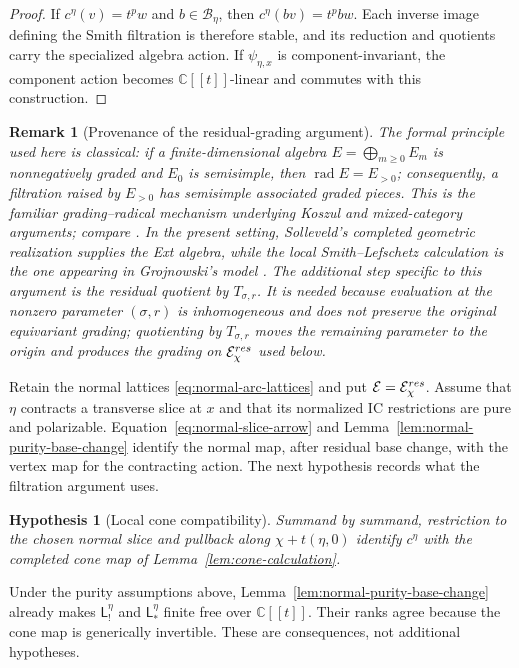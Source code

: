 \documentclass[10pt,a4paper]{amsart}
\newtheorem{hypothesis}[theorem]{Hypothesis}
\newtheorem*{unnumberedremark}{Remark}
\newcommand{\C}{\mathbb C}
\newcommand{\A}{\C[[t]]}
\begin{document}
\begin{proof}
If $c^\eta(v)=t^p w$ and $b\in\mathcal B_\eta$, then
$c^\eta(bv)=t^pbw$.  Each inverse image defining the Smith filtration is
therefore stable, and its reduction and quotients carry the specialized
algebra action.  If $\psi_{\eta,x}$ is component-invariant, the component
action becomes $\A$-linear and commutes with this construction.
\end{proof}

\begin{unnumberedremark}[Provenance of the residual-grading argument]
The formal principle used here is classical: if a finite-dimensional algebra
$E=\bigoplus_{m\geq0}E_m$ is nonnegatively graded and $E_0$ is semisimple,
then $\operatorname{rad}E=E_{>0}$; consequently, a filtration raised by
$E_{>0}$ has semisimple associated graded pieces.  This is the familiar
grading--radical mechanism underlying Koszul and mixed-category arguments;
compare \cite[Section~2.1]{BGS}.  In the present setting, Solleveld's
completed geometric realization supplies the Ext algebra, while the local
Smith--Lefschetz calculation is the one appearing in Grojnowski's model
\cite[Section~2.3]{GrojnowskiJantzen}.  The additional step specific to this
argument is the residual quotient by $T_{\sigma,r}$.  It is needed because
evaluation at the nonzero parameter $(\sigma,r)$ is inhomogeneous and does
not preserve the original equivariant grading; quotienting by
$T_{\sigma,r}$ moves the remaining parameter to the origin and produces the
grading on $\mathcal E_\chi^{\rm res}$ used below.
\end{unnumberedremark}

Retain the normal lattices \eqref{eq:normal-arc-lattices} and put
$\mathcal E=\mathcal E_\chi^{\rm res}$.  Assume that $\eta$ contracts a
transverse slice at $x$ and that its normalized IC restrictions are pure
and polarizable.  Equation~\eqref{eq:normal-slice-arrow} and
Lemma~\ref{lem:normal-purity-base-change} identify the normal map, after
residual base change, with the vertex map for the contracting action.
The next hypothesis records what the filtration argument uses.

\begin{hypothesis}[Local cone compatibility]
\label{hyp:local-cone-compatibility}
Summand by summand, restriction to the chosen normal slice and pullback
along $\chi+t(\eta,0)$ identify $c^\eta$ with the completed cone map of
Lemma~\ref{lem:cone-calculation}.
\end{hypothesis}

Under the purity assumptions above, Lemma~\ref{lem:normal-purity-base-change}
already makes $\mathsf L_!^\eta$ and $\mathsf L_*^\eta$ finite free over
$\A$.  Their ranks agree because the cone map is generically invertible.
These are consequences, not additional hypotheses.
\end{document}
